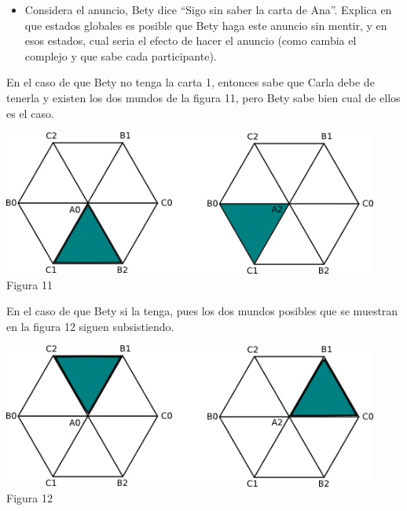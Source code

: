 \documentclass{article}
\begin{document}
\begin{enumerate}
\begin{itemize}
\item Considera el anuncio, Bety dice ``Sigo sin saber la carta de Ana''.
Explica en que estados globales es posible que Bety haga este anuncio
sin mentir, y en esos estados, cual seria el efecto de hacer el anuncio
(como cambia el complejo y que sabe cada participante).\\
\end{itemize}

En el caso de que Bety no tenga la carta 1, entonces sabe que Carla debe de tenerla y existen los dos mundos de la figura 11, pero Bety sabe bien cual de ellos es el caso.

\begin{center}
  \includegraphics[width=350pt]{figura11a.png}\\
  Figura 11
\end{center}

En el caso de que Bety si la tenga, pues los dos mundos posibles que se muestran en la 
figura 12 siguen subsistiendo.

\begin{center}
  \includegraphics[width=350pt]{figura11.png}\\
  Figura 12
\end{center}


\end{enumerate}
\end{document}
